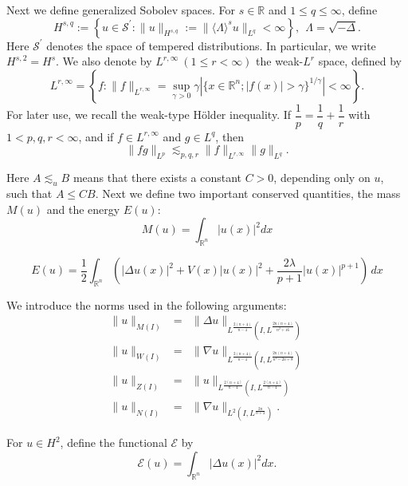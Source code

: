 \documentclass[11pt,a4paper]{article}
\numberwithin{equation}{section}
\begin{document}
Next we define generalized Sobolev spaces. For $s\in \mathbb{R}$ and $1 \leq q \leq \infty$, define
\[
 H^{s, q} := \left\{u \in \mathcal{S}^{\prime} :  \|u\|_{H^{s, q}} := \|\langle \Lambda \rangle^{s} u\|_{L^{q}} < \infty \right\},\ \ \Lambda = \sqrt{-\Delta}.
\]
Here $\mathcal{S}^{\prime}$ denotes the space of tempered distributions. In particular, we write $H^{s, 2} = H^{s}$. We also denote by $L^{r, \infty}\ (1 \leq r < \infty)$ the weak-$L^{r}$ space, defined by
\[
 L^{r, \infty} = \left\{ f: \|f\|_{L^{r, \infty}} = \sup_{\gamma > 0}\gamma \left|\{x \in \mathbb{R}^{n} ; |f(x)| > \gamma \}^{1/\gamma} \right| < \infty \right\}.
\]
For later use, we recall the weak-type H\"{o}lder inequality. If $\dfrac{1}{p} = \dfrac{1}{q} + \dfrac{1}{r}$ with $1 < p, q , r < \infty$, and if $f\in L^{r, \infty}$ and $g \in L^{q}$, then
\begin{equation}\label{weak holder}
\|fg\|_{L^{p}} \lesssim_{p,q,r} \|f\|_{L^{r, \infty}}\|g\|_{L^{q}}.
\end{equation}

Here $ A\lesssim_{u}B$ means that there exists a constant $C > 0$, depending only on $u$, such that $A \leq CB$. Next we define two important conserved quantities, the mass $M(u)$ and the energy $E(u)$:
\begin{equation}\label{eq:mass}
M(u) = \int_{\mathbb{R}^{n}} |u(x)|^{2} dx
\end{equation}

\begin{equation}\label{eq:energy}
E(u) = \frac{1}{2}\int_{\mathbb{R}^{n}} \left(|\Delta u(x)|^{2} + V(x)|u(x)|^{2} + \frac{2\lambda}{p + 1}  |u(x)|^{p + 1}\right)\, dx
\end{equation}

We introduce the norms used in the following arguments:
\begin{eqnarray*}
\|u\|_{M(I)} &=& \|\Delta u\|_{L^{\frac{2(n + 4)}{n - 4} }(I, L^{\frac{2n(n+4)}{n^{2} + 16}})}\\
\|u\|_{W(I)} &=& \|\nabla u\|_{L^{\frac{2(n + 4)}{n - 4} }(I, L^{\frac{2n(n+4)}{n^{2} - 2n + 8}})} \\
\|u\|_{Z(I)} &=& \|u\|_{L^{\frac{2(n + 4)}{n - 4} }(I, L^{\frac{2(n + 4)}{n - 4}})} \\
\|u\|_{N(I)} &=& \|\nabla u\|_{L^{2}(I, L^{\frac{2n}{n + 2}})}.
\end{eqnarray*}

For $u\in H^{2}$, define the functional $\mathcal{E}$ by
\begin{equation}
\mathcal{E}(u) = \int_{\mathbb{R}^{n}} |\Delta u(x)|^{2} dx.
\end{equation}
\end{document}
